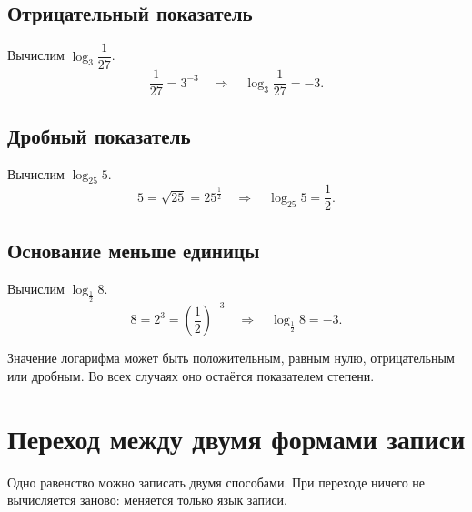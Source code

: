 \subsection{Отрицательный показатель}

\begin{trainingtask}[Пример 3]
  Вычислим \(\log_3 \dfrac1{27}\).
  \[
    \frac1{27}=3^{-3}
    \quad\Longrightarrow\quad
    \boxed{\log_3\frac1{27}=-3}.
  \]
\end{trainingtask}

\subsection{Дробный показатель}

\begin{trainingtask}[Пример 4]
  Вычислим \(\log_{25}5\).
  \[
    5=\sqrt{25}=25^{\frac12}
    \quad\Longrightarrow\quad
    \boxed{\log_{25}5=\frac12}.
  \]
\end{trainingtask}

\subsection{Основание меньше единицы}

\begin{trainingtask}[Пример 5]
  Вычислим \(\log_{\frac12}8\).
  \[
    8=2^3=\left(\frac12\right)^{-3}
    \quad\Longrightarrow\quad
    \boxed{\log_{\frac12}8=-3}.
  \]
\end{trainingtask}

\begin{conclusionbox}
  Значение логарифма может быть положительным, равным нулю, отрицательным
  или дробным. Во всех случаях оно остаётся показателем степени.
\end{conclusionbox}

\section{Переход между двумя формами записи}

Одно равенство можно записать двумя способами. При переходе ничего не
вычисляется заново: меняется только язык записи.

